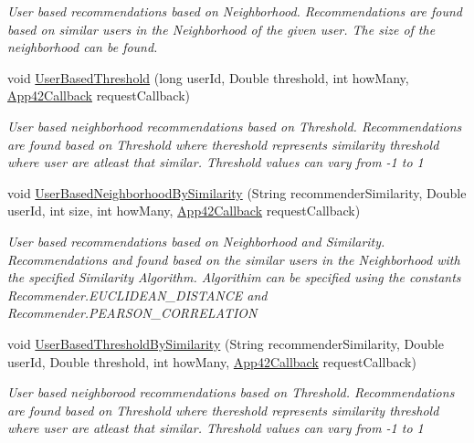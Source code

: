 \begin{DoxyCompactItemize}
\begin{DoxyCompactList}\small\item\em User based recommendations based on Neighborhood. Recommendations are found based on similar users in the Neighborhood of the given user. The size of the neighborhood can be found. \end{DoxyCompactList}\item 
void \hyperlink{classcom_1_1shephertz_1_1app42_1_1paas_1_1sdk_1_1windows_1_1recommend_1_1_recommender_service_a82e16853d786be6b2fcc1a85d43a2ce9}{User\+Based\+Threshold} (long user\+Id, Double threshold, int how\+Many, \hyperlink{interfacecom_1_1shephertz_1_1app42_1_1paas_1_1sdk_1_1windows_1_1_app42_callback}{App42\+Callback} request\+Callback)
\begin{DoxyCompactList}\small\item\em User based neighborhood recommendations based on Threshold. Recommendations are found based on Threshold where thereshold represents similarity threshold where user are atleast that similar. Threshold values can vary from -\/1 to 1 \end{DoxyCompactList}\item 
void \hyperlink{classcom_1_1shephertz_1_1app42_1_1paas_1_1sdk_1_1windows_1_1recommend_1_1_recommender_service_af525e75bfb8f632c5986d6e6a5c1947d}{User\+Based\+Neighborhood\+By\+Similarity} (String recommender\+Similarity, Double user\+Id, int size, int how\+Many, \hyperlink{interfacecom_1_1shephertz_1_1app42_1_1paas_1_1sdk_1_1windows_1_1_app42_callback}{App42\+Callback} request\+Callback)
\begin{DoxyCompactList}\small\item\em User based recommendations based on Neighborhood and Similarity. Recommendations and found based on the similar users in the Neighborhood with the specified Similarity Algorithm. Algorithim can be specified using the constants Recommender.\+E\+U\+C\+L\+I\+D\+E\+A\+N\+\_\+\+D\+I\+S\+T\+A\+N\+C\+E and Recommender.\+P\+E\+A\+R\+S\+O\+N\+\_\+\+C\+O\+R\+R\+E\+L\+A\+T\+I\+O\+N \end{DoxyCompactList}\item 
void \hyperlink{classcom_1_1shephertz_1_1app42_1_1paas_1_1sdk_1_1windows_1_1recommend_1_1_recommender_service_ae02fe1c13c7fbbba32c5dd3fc398f80d}{User\+Based\+Threshold\+By\+Similarity} (String recommender\+Similarity, Double user\+Id, Double threshold, int how\+Many, \hyperlink{interfacecom_1_1shephertz_1_1app42_1_1paas_1_1sdk_1_1windows_1_1_app42_callback}{App42\+Callback} request\+Callback)
\begin{DoxyCompactList}\small\item\em User based neighborood recommendations based on Threshold. Recommendations are found based on Threshold where thereshold represents similarity threshold where user are atleast that similar. Threshold values can vary from -\/1 to 1 \end{DoxyCompactList}\item 

\end{DoxyCompactItemize}
